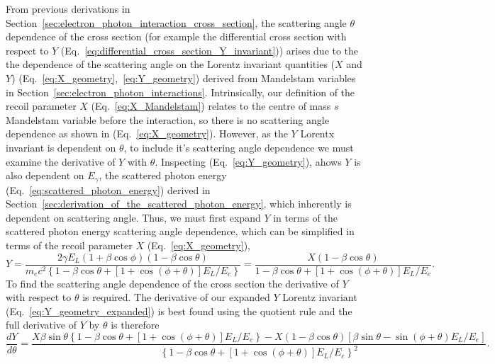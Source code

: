 \documentclass[../main.tex]{subfiles}
\begin{document}
From previous derivations in Section~\ref{sec:electron_photon_interaction_cross_section}, the scattering angle $\theta$ dependence of the cross section (for example the differential cross section with respect to $Y$ (Eq.~\ref{eq:differential_cross_section_Y_invariant})) arises due to the the dependence of the scattering angle on the Lorentz invariant quantities ($X$ and $Y$) (Eq.~\ref{eq:X_geometry},~\ref{eq:Y_geometry}) derived from Mandelstam variables in Section~\ref{sec:electron_photon_interactions}. Intrinsically, our definition of the recoil parameter $X$ (Eq.~\ref{eq:X_Mandelstam}) relates to the centre of mass $s$ Mandelstam variable before the interaction, so there is no scattering angle dependence as shown in (Eq.~\ref{eq:X_geometry}). However, as the $Y$ Lorentx invariant is dependent on $\theta$, to include it's scattering angle dependence we must examine the derivative of $Y$ with $\theta$. Inspecting (Eq.~\ref{eq:Y_geometry}), ahows $Y$ is also dependent on $E_{\gamma}$, the scattered photon energy (Eq.~\ref{eq:scattered_photon_energy}) derived in Section~\ref{sec:derivation_of_the_scattered_photon_energy}, which inherently is dependent on scattering angle. Thus, we must first expand $Y$ in terms of the scattered photon energy scattering angle dependence, which can be simplified in terms of the recoil parameter $X$ (Eq.~\ref{eq:X_geometry}),
\begin{equation}
Y = \frac{2\gamma E_{L}\left(1+\beta\cos\phi\right)\left(1-\beta\cos\theta\right)}{m_{e}c^{2}\left\{1-\beta\cos\theta+\left[1+\cos\left(\phi+\theta\right)\right]E_{L}/E_{e}\right\}} = \frac{X\left(1-\beta\cos\theta\right)}{1-\beta\cos\theta+\left[1+\cos\left(\phi+\theta\right)\right]E_{L}/E_{e}}.
\label{eq:Y_geometry_expanded}
\end{equation}
To find the scattering angle dependence of the cross section the derivative of $Y$ with respect to $\theta$ is required. The derivative of our expanded $Y$ Lorentz invariant (Eq.~\ref{eq:Y_geometry_expanded}) is best found using the quotient rule and the full derivative of $Y$ by $\theta$ is therefore
\begin{equation}
\frac{dY}{d\theta} = \frac{X\beta\sin\theta\left\{1-\beta\cos\theta+\left[1+\cos\left(\phi+\theta\right)\right]E_{L}/E_{e}\right\}-X\left(1-\beta\cos\theta\right)\left[\beta\sin\theta-\sin\left(\phi+\theta\right)E_{L}/E_{e}\right]}{\left\{1-\beta\cos\theta+\left[1+\cos\left(\phi+\theta\right)\right]E_{L}/E_{e}\right\}^{2}}.
\label{eq:dY_dtheta}
\end{equation}
\end{document}
